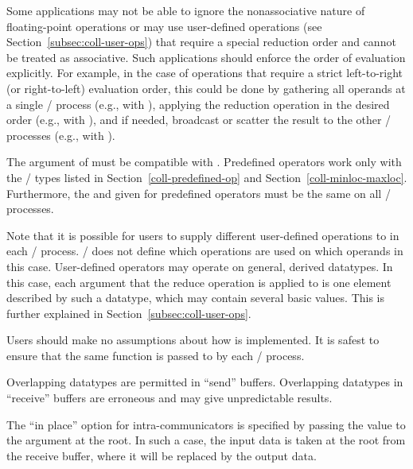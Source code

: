 \begin{users}
Some applications may not be able to ignore the nonassociative nature of
floating-point operations or may use user-defined operations
(see Section~\ref{subsec:coll-user-ops}) that require a special reduction
order and cannot be treated as associative.
Such applications should enforce the order of evaluation explicitly.
For example, in the case of operations that require a strict left-to-right
(or right-to-left) evaluation order, this could be done by gathering all
operands at a single \MPI/ process (e.g., with ), applying the
reduction operation in the desired order (e.g., with ),
and if needed, broadcast or scatter the result to the other \MPI/ processes
(e.g., with ).
\end{users}

The  argument of  must be
compatible with
.
Predefined operators work only with
the \MPI/ types listed in Section~\ref{coll-predefined-op} and
Section~\ref{coll-minloc-maxloc}.  Furthermore, the
 and  given for predefined operators
must be the same on all \MPI/ processes.

Note that it is possible for users to supply different user-defined operations
to  in each \MPI/ process.  \MPI/ does not define which
operations are used on which operands in this case.
User-defined operators may operate on general, derived datatypes.
In this case, each argument that
the reduce operation is applied to is one element described by such a datatype,
which may contain several basic values.
This is further explained in Section~\ref{subsec:coll-user-ops}.
\begin{users}
  Users should make no assumptions about how  is
  implemented.  It is safest to ensure that the same function is passed to
   by each \MPI/ process.
\end{users}

Overlapping datatypes are permitted in ``send'' buffers.
Overlapping datatypes in ``receive'' buffers are erroneous
and may give unpredictable results.

The ``in place'' option  for intra-communicators is specified by passing the
value
 to the argument  at the root.
In such a case, the input data is taken at the root from the receive buffer,
where it will be replaced by the output data.


